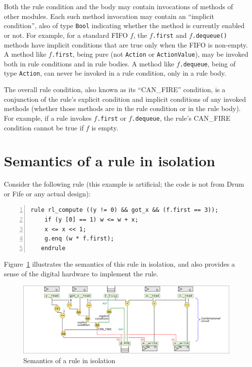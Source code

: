 
Both the rule condition and the body may contain invocations of
methods of other modules.  Each such method invocation may contain an
``implicit condition'', also of type \verb|Bool| indicating whether
the method is currently enabled or not.  For example, for a standard
FIFO $f$, the $f$\verb|.first| and $f$\verb|.dequeue()| methods have
implicit conditions that are true only when the FIFO is non-empty.  A
method like $f$\verb|.first|, being pure (not \verb|Action| or
\verb|ActionValue|), may be invoked both in rule conditions and in
rule bodies.  A method like $f$\verb|.dequeue|, being of type
\verb|Action|, can never be invoked in a rule condition, only in a
rule body.

The overall rule condition, also known as its ``CAN\_FIRE'' condition,
is a conjunction of the rule's explicit condition and implicit
conditions of any invoked methods (whether those methods are in the
rule condition or in the rule body).  For example, if a rule invokes
$f$\verb|.first| or $f$\verb|.dequeue|, the rule's CAN\_FIRE condition
cannot be true if $f$ is empty.


\section{Semantics of a rule in isolation}


Consider the following rule (this example is artificial; the code is
not from Drum or Fife or any actual design):

{\small
\begin{Verbatim}[frame=single, numbers=left]
   rule rl_compute ((y != 0) && got_x && (f.first == 3));
    if (y [0] == 1) w <= w + x;
    x <= x << 1;
    g.enq (w * f.first);
   endrule
\end{Verbatim}
}

Figure~\ref{Fig_Rule_Actions} illustrates the semantics of this rule
in isolation, and also provides a sense of the digital hardware to
implement the rule.
\begin{figure}[htbp]
  \centerline{\includegraphics[width=6in,angle=0]{Figures/Fig_Rule_Actions}}
  \caption{\label{Fig_Rule_Actions} Semantics of a rule in isolation}
\end{figure}


